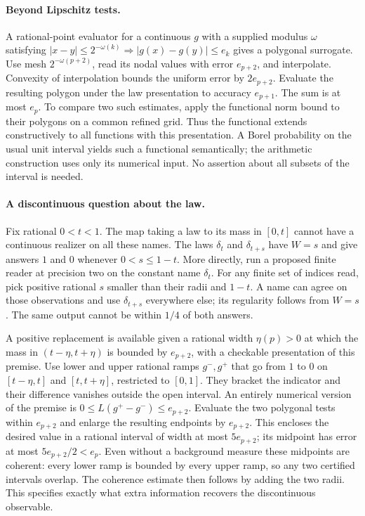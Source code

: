 \paragraph{Beyond Lipschitz tests.}
A rational-point evaluator for a continuous $g$ with a supplied modulus
$\omega$ satisfying $|x-y|\le2^{-\omega(k)}\Rightarrow |g(x)-g(y)|\le e_k$
gives a polygonal surrogate. Use mesh $2^{-\omega(p+2)}$, read its nodal
values with error $e_{p+2}$, and interpolate. Convexity of interpolation
bounds the uniform error by $2e_{p+2}$. Evaluate the resulting polygon
under the law presentation to accuracy $e_{p+1}$. The sum is at most $e_p$.
To compare two such estimates, apply the functional norm bound to their
polygons on a common refined grid. Thus the functional extends constructively
to all functions with this presentation. A Borel probability on the usual
unit interval yields such a functional semantically; the arithmetic
construction uses only its numerical input. No assertion about all subsets of
the interval is needed.

\paragraph{A discontinuous question about the law.}
Fix rational $0<t<1$. The map taking a law to its mass in $[0,t]$ cannot
have a continuous realizer on all these names. The laws $\delta_t$ and
$\delta_{t+s}$ have $W=s$ and give answers $1$ and $0$ whenever
$0<s\le1-t$. More directly, run a proposed finite reader at precision two on
the constant name $\delta_t$. For any finite set of indices read, pick
positive rational $s$ smaller than their radii and $1-t$.
A name can agree on those observations and use $\delta_{t+s}$ everywhere
else; its regularity follows from $W=s$. The same output cannot be within
$1/4$ of both answers.

A positive replacement is available given a rational width $\eta(p)>0$ at
which the mass in $(t-\eta,t+\eta)$ is bounded by $e_{p+2}$, with a
checkable presentation of this premise. Use lower and upper rational ramps
$g^-,g^+$ that go from $1$ to $0$ on $[t-\eta,t]$ and $[t,t+\eta]$,
restricted to $[0,1]$. They bracket the indicator and their difference vanishes
outside the open interval. An entirely numerical version of the premise
is $0\le L(g^+-g^-)\le e_{p+2}$. Evaluate the two polygonal tests within
$e_{p+2}$ and enlarge the resulting endpoints by $e_{p+2}$. This encloses
the desired value in a rational interval of width at most $5e_{p+2}$;
its midpoint has error at most $5e_{p+2}/2<e_p$. Even without a background
measure these midpoints are coherent: every lower ramp is bounded by every
upper ramp, so any two certified intervals overlap. The coherence estimate
then follows by adding the two radii. This specifies exactly what extra
information recovers the discontinuous observable.

